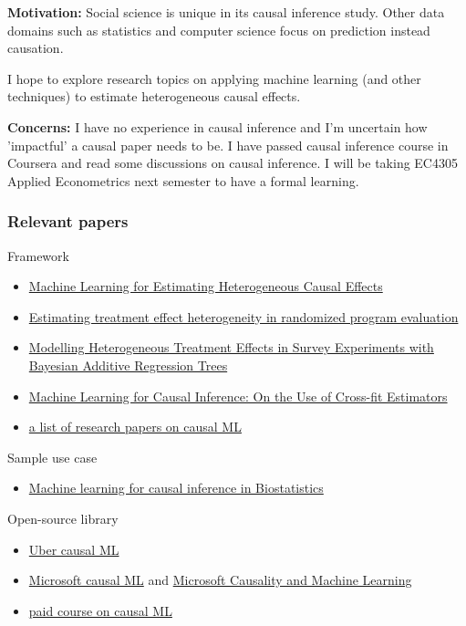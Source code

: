 \documentclass[11pt, oneside]{article}   	%
\begin{document}
    \textbf{Motivation:}
    Social science is unique in its causal inference study. 
    Other data domains such as statistics and computer science focus on prediction instead causation.

    I hope to explore research topics on applying machine learning (and other techniques) to estimate
    heterogeneous causal effects.

    \textbf{Concerns:} I have no experience in causal inference and I'm uncertain how 'impactful' a
    causal paper needs to be.
    I have passed causal inference course in Coursera and read some discussions on causal inference.
    I will be taking EC4305 Applied Econometrics next semester to have a formal learning.

    \subsubsection{Relevant papers}
    Framework
    \begin{itemize}
        \item \href{https://ideas.repec.org/p/ecl/stabus/3350.html}{Machine Learning for Estimating Heterogeneous Causal
            Effects}
        \item \href{https://imai.fas.harvard.edu/research/files/svm.pdf}{Estimating treatment effect heterogeneity in
            randomized program evaluation}
        \item \href{https://academic.oup.com/poq/article-abstract/76/3/491/1893905}{Modelling Heterogeneous Treatment
            Effects in Survey Experiments with Bayesian Additive Regression Trees}
        \item \href{https://oce-ovid-com.libproxy1.nus.edu.sg/article/00001648-202105000-00012/HTML}{Machine Learning
            for Causal Inference: On the Use of Cross-fit Estimators}
        \item \href{https://github.com/jvpoulos/causal-ml}{a list of research papers on causal ML}
    \end{itemize}

    Sample use case
    \begin{itemize}
        \item \href{https://academic-oup-com.libproxy1.nus.edu.sg/biostatistics/article/21/2/336/5631847}{Machine
            learning for causal inference in Biostatistics}
    \end{itemize}

    Open-source library
    \begin{itemize}
        \item \href{https://github.com/uber/causalml}{Uber causal ML}
        \item \href{https://github.com/microsoft/EconML}{Microsoft causal ML} and
            \href{https://www.microsoft.com/en-us/research/group/causal-inference/}{Microsoft Causality and Machine
            Learning}
        \item \href{https://www.altdeep.ai/p/causal-ml-minicourse}{paid course on causal ML}
    \end{itemize}
\end{document}
